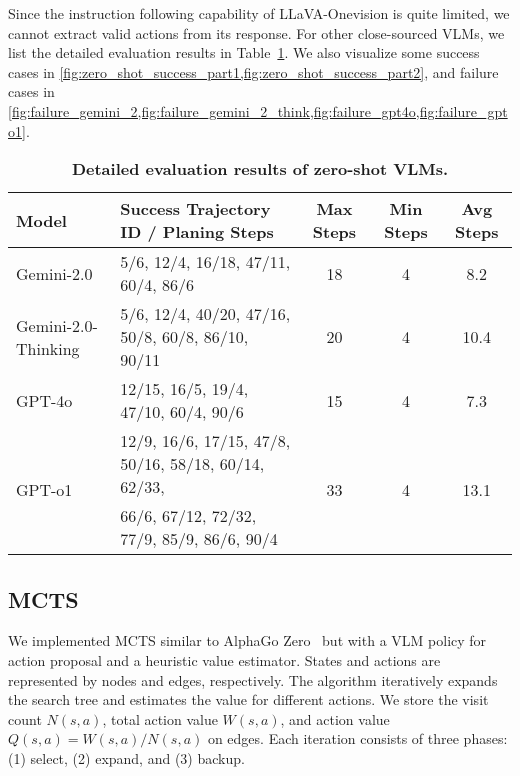 Since the instruction following capability of LLaVA-Onevision is quite limited, we cannot extract valid actions from its response. For other close-sourced VLMs, we list the detailed evaluation results in Table~\ref{tab:zero_shot_details}. We also visualize some success cases in \cref{fig:zero_shot_success_part1,fig:zero_shot_success_part2}, and failure cases in \cref{fig:failure_gemini_2,fig:failure_gemini_2_think,fig:failure_gpt4o,fig:failure_gpto1}.

\begin{table}[thb]
\caption{\textbf{Detailed evaluation results of zero-shot VLMs.}}
\label{tab:zero_shot_details}
\centering
\begin{tabular}{llccc}
\toprule
Model                   & Success Trajectory ID / Planing Steps                & Max Steps           & Min Steps          & Avg Steps             
\\
\toprule
Gemini-2.0              & 5/6, 12/4, 16/18, 47/11, 60/4, 86/6                  & 18                  & 4                  & 8.2                   \\
\midrule
Gemini-2.0-Thinking     & 5/6, 12/4, 40/20, 47/16, 50/8, 60/8, 86/10, 90/11    & 20                  & 4                  & 10.4                  \\
\midrule
GPT-4o                  & 12/15, 16/5, 19/4, 47/10, 60/4, 90/6                 & 15                  & 4                  & 7.3                   \\
\midrule
\multirow{2}{*}{GPT-o1} & 12/9, 16/6, 17/15, 47/8, 50/16, 58/18, 60/14, 62/33, & \multirow{2}{*}{33} & \multirow{2}{*}{4} & \multirow{2}{*}{13.1} \\
                        & 66/6, 67/12, 72/32, 77/9, 85/9, 86/6, 90/4           &                     &                    &
                        \\ \bottomrule
\end{tabular}
\end{table}

\subsection{MCTS}

We implemented MCTS similar to AlphaGo Zero~\cite{alphagozero} but with a VLM policy for action proposal and a heuristic value estimator. States and actions are represented by nodes and edges, respectively. The algorithm iteratively expands the search tree and estimates the value for different actions. We store the visit count $N(s,a)$, total action value $W(s,a)$, and action value $Q(s,a)=W(s,a)/N(s,a)$ on edges. Each iteration consists of three phases: (1) select, (2) expand, and (3) backup.

